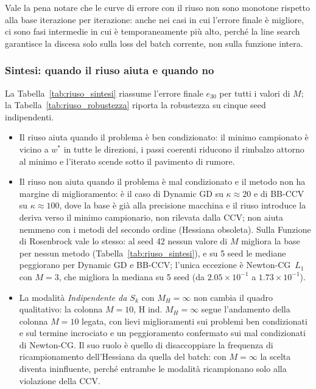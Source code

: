 \documentclass[a4paper,12pt]{article}
\numberwithin{equation}{section}
\numberwithin{figure}{section}
\numberwithin{table}{section}
\begin{document}
Vale la pena notare che le curve di errore con il riuso non sono monotone
rispetto alla base iterazione per iterazione: anche nei casi in cui l'errore
finale è migliore, ci sono fasi intermedie in cui è temporaneamente più alto,
perché la line search garantisce la discesa solo sulla loss del batch corrente,
non sulla funzione intera.

\subsubsection{Sintesi: quando il riuso aiuta e quando no}\label{app:riuso-sintesi}

La Tabella~\ref{tab:riuso_sintesi} riassume l'errore finale $e_{30}$ per tutti
i valori di $M$; la Tabella~\ref{tab:riuso_robustezza} riporta la robustezza
su cinque seed indipendenti.

\begin{itemize}
\item Il riuso aiuta quando il problema è ben condizionato: il minimo
  campionato è vicino a $w^*$ in tutte le direzioni, i passi coerenti riducono
  il rimbalzo attorno al minimo e l'iterato scende sotto il pavimento di
  rumore.
\item Il riuso non aiuta quando il problema è mal condizionato e il metodo
  non ha margine di miglioramento: è il caso di Dynamic GD su
  $\kappa\approx20$ e di BB-CCV su $\kappa\approx100$, dove la base è già alla
  precisione macchina e il riuso introduce la deriva verso il minimo
  campionario, non rilevata dalla CCV; non aiuta nemmeno con i metodi del
  secondo ordine (Hessiana obsoleta). Sulla Funzione di Rosenbrock vale lo
  stesso: al seed 42 nessun valore di $M$ migliora la base per nessun metodo
  (Tabella~\ref{tab:riuso_sintesi}), e su 5 seed le mediane peggiorano per
  Dynamic GD e BB-CCV; l'unica eccezione è Newton-CG~$L_1$ con $M{=}3$, che
  migliora la mediana su 5 seed (da $2.05\times10^{-1}$ a $1.73\times10^{-1}$).
\item La modalità \emph{Indipendente da $S_k$} con $M_H=\infty$ non cambia il
  quadro qualitativo: la colonna $M{=}10$, H ind. $M_H{=}\infty$ segue
  l'andamento della colonna $M{=}10$ legata, con lievi miglioramenti sui
  problemi ben condizionati e sul termine incrociato e un peggioramento
  confermato sui mal condizionati di Newton-CG. Il suo ruolo è quello di
  disaccoppiare la frequenza di ricampionamento dell'Hessiana da quella del
  batch: con $M=\infty$ la scelta diventa ininfluente, perché entrambe le
  modalità ricampionano solo alla violazione della CCV.
\end{itemize}
\end{document}
